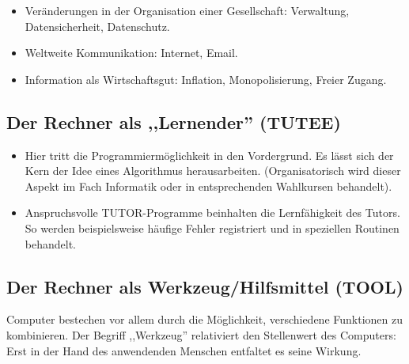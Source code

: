 \begin{itemize}
\begin{itemize}
\item Ver\"{a}nderungen in der Organisation einer Gesellschaft: Verwaltung, Datensicherheit, Datenschutz.
\item Weltweite Kommunikation: Internet, Email.
\item Information als Wirtschaftsgut: Inflation, Monopolisierung, Freier Zugang.
\end{itemize}
\end{itemize}

\subsection{Der Rechner als ,,Lernender'' (TUTEE)}

\begin{itemize}
\item
Hier tritt die Programmierm\"{o}glichkeit in den Vordergrund. Es l\"{a}sst
sich der Kern der Idee eines Algorithmus herausarbeiten.
(Organisatorisch wird dieser Aspekt im Fach Informatik oder in
entsprechenden Wahlkursen behandelt).
\item
Anspruchsvolle TUTOR-Programme beinhalten die Lernf\"{a}higkeit des
Tutors. So werden beispielsweise h\"{a}ufige Fehler registriert und in
speziellen Routinen behandelt.
\end{itemize}

\subsection{Der Rechner als Werkzeug/Hilfsmittel (TOOL)}

Computer bestechen vor allem durch die M\"{o}glichkeit, verschiedene
Funktionen zu kombinieren.
\mip
Der Begriff ,,Werkzeug'' relativiert den Stellenwert
des Computers: Erst in der Hand des anwendenden Menschen
entfaltet es seine Wirkung.

